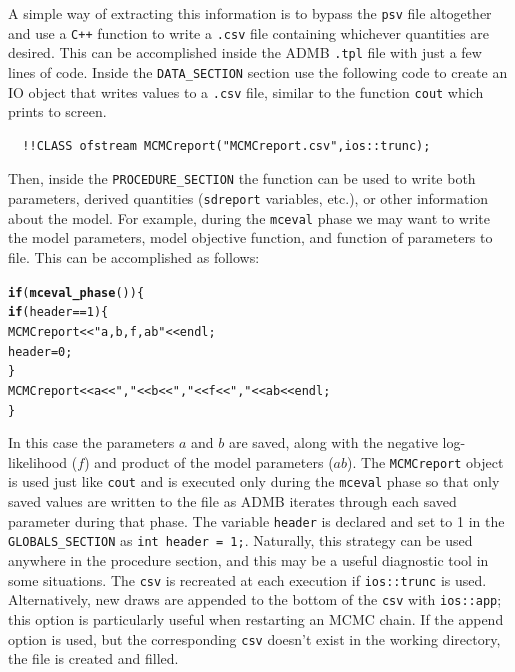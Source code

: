 \documentclass{article}\usepackage[]{graphicx}\usepackage[]{color}
\makeatletter
\newcommand{\hlstr}[1]{\textcolor[rgb]{0.192,0.494,0.8}{#1}}%
\newcommand{\hlkwd}[1]{\textcolor[rgb]{0.737,0.353,0.396}{\textbf{#1}}}%
\newenvironment{kframe}{%
 \def\at@end@of@kframe{}%
 \ifinner\ifhmode%
  \def\at@end@of@kframe{\end{minipage}}%
  \begin{minipage}{\columnwidth}%
 \fi\fi%
 \def\FrameCommand##1{\hskip\@totalleftmargin \hskip-\fboxsep
 \colorbox{shadecolor}{##1}\hskip-\fboxsep
     \hskip-\linewidth \hskip-\@totalleftmargin \hskip\columnwidth}%
 \MakeFramed {\advance\hsize-\width
   \@totalleftmargin\z@ \linewidth\hsize
   \@setminipage}}%
 {\par\unskip\endMakeFramed%
 \at@end@of@kframe}
\newenvironment{knitrout}{}{} %
\makeatother
\begin{document}
A simple way of extracting this information is to bypass the
\texttt{psv} file altogether and use a \texttt{C++} function
to write a \texttt{.csv} file containing whichever quantities
are desired. This can be accomplished inside the ADMB
\texttt{.tpl} file with just a few lines of code. Inside the
\texttt{DATA\_SECTION} section use the following code to
create an IO object that writes values to a \texttt{.csv}
file, similar to the function \texttt{cout} which prints to
screen.
\begin{verbatim}
  !!CLASS ofstream MCMCreport("MCMCreport.csv",ios::trunc);
\end{verbatim}
Then, inside the \texttt{PROCEDURE\_SECTION} the function can be used to
write both parameters, derived quantities (\texttt{sdreport} variables,
etc.), or other information about the model. For example, during the
\texttt{mceval} phase we may want to write the model parameters, model
objective function, and function of parameters to file. This can be
accomplished as follows:
\begin{knitrout}
\color{fgcolor}\begin{kframe}
\begin{alltt}
  \hlkwd{if}(\hlkwd{mceval_phase}())\{
    \hlkwd{if}(header==1) \{
        MCMCreport << \hlstr{"a,b,f,ab"} << endl;
        header=0;
    \}
    MCMCreport << a <<\hlstr{","} << b << \hlstr{","} << f << \hlstr{","} << ab << endl;
  \}
\end{alltt}
\end{kframe}
\end{knitrout}


In this case the parameters $a$ and $b$ are saved, along
with the negative log-likelihood ($f$) and product of the
model parameters ($ab$).  The \texttt{MCMCreport} object is
used just like \texttt{cout} and is executed only during the
\texttt{mceval} phase so that only saved values are written
to the file as ADMB iterates through each saved parameter
during that phase. The variable \texttt{header} is declared
and set to 1 in the \texttt{GLOBALS\_SECTION} as \texttt{int
  header = 1;}. Naturally, this strategy can be used
anywhere in the procedure section, and this may be a useful
diagnostic tool in some situations. The \texttt{csv} is
recreated at each execution if \texttt{ios::trunc} is
used. Alternatively, new draws are appended to the bottom of
the \texttt{csv} with \texttt{ios::app}; this option is
particularly useful when restarting an MCMC chain. If the
append option is used, but the corresponding \texttt{csv}
doesn't exist in the working directory, the file is created
and filled.
\end{document}
